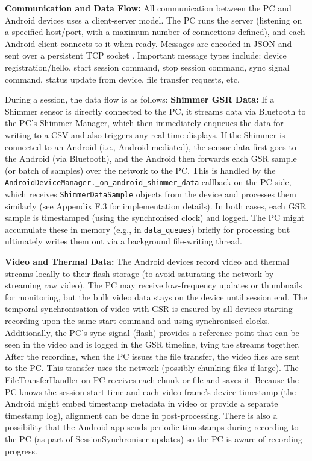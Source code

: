 \textbf{Communication and Data Flow:} All communication between the PC and Android devices uses a client-server model. The PC runs the server (listening on a specified host/port, with a maximum number of connections defined), and each Android client connects to it when ready. Messages are encoded in JSON and sent over a persistent TCP socket \citep{ref21}. Important message types include: device registration/hello, start session command, stop session command, sync signal command, status update from device, file transfer requests, etc.

During a session, the data flow is as follows: \textbf{Shimmer GSR Data:} If a Shimmer sensor is directly connected to the PC, it streams data via Bluetooth to the PC's Shimmer Manager, which then immediately enqueues the data for writing to a CSV and also triggers any real-time displays. If the Shimmer is connected to an Android (i.e., Android-mediated), the sensor data first goes to the Android (via Bluetooth), and the Android then forwards each GSR sample (or batch of samples) over the network to the PC. This is handled by the \texttt{AndroidDeviceManager.\_on\_android\_shimmer\_data} callback on the PC side, which receives \texttt{ShimmerDataSample} objects from the device and processes them similarly (see Appendix F.3 for implementation details). In both cases, each GSR sample is timestamped (using the synchronised clock) and logged. The PC might accumulate these in memory (e.g., in \texttt{data\_queues}) briefly for processing but ultimately writes them out via a background file-writing thread.

\textbf{Video and Thermal Data:} The Android devices record video and thermal streams locally to their flash storage (to avoid saturating the network by streaming raw video). The PC may receive low-frequency updates or thumbnails for monitoring, but the bulk video data stays on the device until session end. The temporal synchronisation of video with GSR is ensured by all devices starting recording upon the same start command and using synchronised clocks. Additionally, the PC's sync signal (flash) provides a reference point that can be seen in the video and is logged in the GSR timeline, tying the streams together. After the recording, when the PC issues the file transfer, the video files are sent to the PC. This transfer uses the network (possibly chunking files if large). The FileTransferHandler on PC receives each chunk or file and saves it. Because the PC knows the session start time and each video frame's device timestamp (the Android might embed timestamp metadata in video or provide a separate timestamp log), alignment can be done in post-processing. There is also a possibility that the Android app sends periodic timestamps during recording to the PC (as part of SessionSynchroniser updates) so the PC is aware of recording progress.

